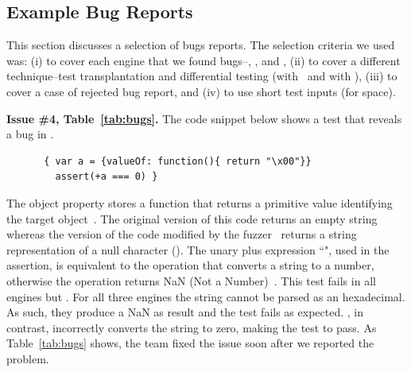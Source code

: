 \documentclass[sigconf,review, anonymous]{acmart}
\begin{document}
\subsection{Example Bug Reports}

This section discusses a selection of bugs reports. The selection
criteria we used was: (i) to cover each engine that we found
bugs--\chakra, \jsc, and \veight, (ii) to cover a different
technique--test transplantation and differential testing (with
\radamsa\ and with \quickfuzz), (iii) to cover a case of rejected bug
report, and (iv) to use short test inputs (for space).


\sloppy
\vspace{1ex}\noindent\textbf{Issue \#4, Table~\ref{tab:bugs}.} The
code snippet below shows a test that reveals a bug in \chakra.

\begin{figure}[h!]
  \centering
  \scriptsize
  \begin{lstlisting}
 { var a = {valueOf: function(){ return "\x00"}}
   assert(+a === 0) }
  \end{lstlisting}
  \normalsize
\end{figure}

The object property  stores a function that returns a
primitive value identifying the target object~\cite{valueof}. The
original version of this code returns an empty string whereas the
version of the code modified by the \radamsa{} fuzzer~\cite{radamsa}
returns a string representation of a null character (). The unary plus expression ``", used in the
assertion, is equivalent to the operation
 that converts a string to a number,
otherwise the operation returns NaN (Not a
Number)~\cite{unary-plus}. This test fails in all engines but
\chakra{}. For all three engines the string cannot be parsed as an
hexadecimal. As such, they produce a NaN as result and the test fails
as expected. \chakra{}, in contrast, incorrectly converts the string
to zero, making the test to pass. As Table~\ref{tab:bugs} shows, the
\chakra{} team fixed the issue soon after we reported the problem.
\end{document}
